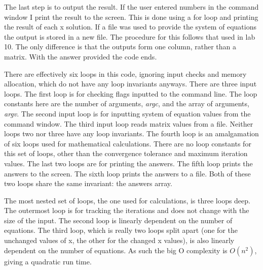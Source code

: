 \documentclass{article}
\begin{document}
The last step is to output the result. If the user entered numbers in the command window I print the result to the screen. This is done using a for loop and printing the result of each x solution. If a file was used to provide the system of equations the output is stored in a new file. The procedure for this follows that used in lab 10. The only difference is that the outputs form one column, rather than a matrix. With the answer provided the code ends.

There are effectively six loops in this code, ignoring input checks and memory allocation, which do not have any loop invariants anyways. There are three input loops. The first loop is for checking flags inputted to the command line. The loop constants here are the number of arguments, \textit{argc}, and the array of arguments, \textit{argv}. The second input loop is for inputting system of equation values from the command window. The third input loop reads matrix values from a file. Neither loops two nor three have any loop invariants. The fourth loop is an amalgamation of six loops used for mathematical calculations. There are no loop constants for this set of loops, other than the convergence tolerance and maximum iteration values. The last two loops are for printing the answers. The fifth loop prints the answers to the screen. The sixth loop prints the answers to a file. Both of these two loops share the same invariant: the answers array.

The most nested set of loops, the one used for calculations, is three loops deep. The outermost loop is for tracking the iterations and does not change with the size of the input. The second loop is linearly dependent on the number of equations. The third loop, which is really two loops split apart (one for the unchanged values of x, the other for the changed x values), is also linearly dependent on the number of equations. As such the big O complexity is $O(n^2)$, giving a quadratic run time.
\end{document}

